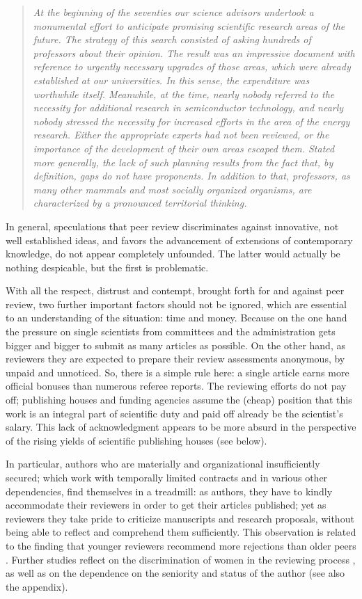 \begin{quote} {\em At the beginning of the seventies our science advisors
undertook a monumental effort to anticipate promising scientific
research areas of the future.  The strategy of this search consisted of
asking hundreds of professors about their opinion.  The result was an
impressive document with reference to urgently necessary upgrades of
those areas, which were already established at our universities.  In
this sense, the expenditure was worthwhile itself.  Meanwhile, at the
time, nearly nobody referred to the necessity for additional research in
semiconductor technology, and nearly nobody stressed the necessity for
increased efforts in the area of the energy research.  Either the
appropriate experts had not been reviewed, or the importance of the
development of their own areas escaped them.  Stated more generally,
the lack of such planning results from the fact that, by definition, gaps
do not have proponents.  In addition to that, professors, as many other
mammals and  most socially organized organisms, are characterized by
a pronounced territorial thinking.  } \end{quote}
In general,
speculations that peer review discriminates against innovative, not well
established ideas, and favors the advancement of extensions of contemporary knowledge,
do not appear
completely unfounded.  The latter would actually be nothing despicable,
but the first is problematic.


With all the respect, distrust and contempt,  brought forth for and against  peer
review, two further important factors should not be ignored, which
are essential to an understanding of the situation:  time and money.
Because on the one hand the pressure on single scientists from
committees and the administration gets bigger and bigger to submit as
many articles as possible.  On the other hand, as reviewers they are
expected to prepare their review assessments anonymous, by unpaid and
unnoticed.  So, there is a simple rule here:  a single article earns
more official bonuses than numerous referee reports.  The reviewing
efforts do not pay off; publishing houses and funding agencies assume
the (cheap) position that this work is an integral part of scientific
duty and paid off already be the scientist's salary.  This lack of
acknowledgment appears to be more absurd in the perspective of the rising
yields of scientific publishing houses (see below).


In particular, authors who are materially and organizational
insufficiently secured; which work with temporally limited contracts and
in various other dependencies, find themselves in a treadmill:  as
authors, they have to kindly accommodate their reviewers in order to get
their articles published; yet as reviewers they take pride to criticize
manuscripts and research proposals, without being able to reflect and
comprehend them sufficiently.  This observation is related to the finding that
younger reviewers recommend more
rejections than older peers \cite{1994-nylenna}.  Further studies
reflect on the discrimination of women in the reviewing process
\cite{wenneras-wold-97}, as well as on the dependence on the seniority
and status of the author (see also the appendix).

